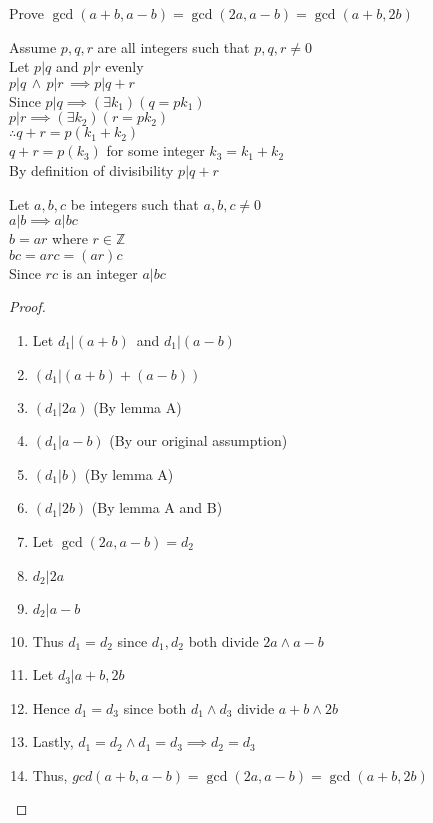 \documentclass[12pt]{article}
\newenvironment{lemma}[2][Lemma]{\begin{trivlist}
\item[\hskip \labelsep {\bfseries #1}\hskip \labelsep {\bfseries #2.}]}{\end{trivlist}}
\newenvironment{question}[2][Question]{\begin{trivlist}
\item[\hskip \labelsep {\bfseries #1}\hskip \labelsep {\bfseries #2.}]}{\end{trivlist}}
\newenvironment{level}%
{\addtolength{\itemindent}{2em}}%
{\addtolength{\itemindent}{-2em}}
\begin{document}
\begin{question}{6.17}Prove $\gcd(a+b,a-b)=\gcd(2a,a-b)=\gcd(a+b,2b)$\leavevmode
\begin{lemma}{A}
	Assume $p,q,r$ are all integers such that $p,q,r \neq 0$\\
	Let $p|q$ and $p|r$ evenly\\
	$p|q \, \wedge \, p|r \, \implies p|q+r$\\
	Since $p|q \implies (\exists k_1)(q=pk_1)$\\
	$p|r \implies (\exists k_2)(r=pk_2)$\\
	$\therefore q+r = p(k_1+k_2)$\\
	$q+r=p(k_3)$ for some integer $k_3=k_1+k_2$\\
	By definition of divisibility $p|q+r$\\
\end{lemma}
\begin{lemma}{B}
	Let $a,b,c$ be integers such that $a,b,c \neq 0$\\
	$a|b \implies a|bc$\\
	$b=ar$ where $r \in \mathbb{Z}$\\
	$bc=arc=(ar)c$\\
	Since $rc$ is an integer $a|bc$
\end{lemma}
\begin{proof}\leavevmode
\begin{enumerate}
	\item Let $d_1|(a+b)\,$ and $d_1|(a-b)$
	\begin{level}
		\item $(d_1 | (a+b)+(a-b))$
		\item $(d_1 | 2a )$ \hfill(By lemma A)
		\item $(d_1 | a-b )$ \hfill(By our original assumption)
		\item $(d_1 | b)$ \hfill(By lemma A)
		\item $(d_1 | 2b)$ \hfill(By lemma A and B)
	\end{level}
	\item Let $\gcd(2a,a-b)=d_2$
	\begin{level}
		\item $d_2 | 2a$
		\item $d_2 | a-b$
		\item Thus $d_1 = d_2$ since $d_1 , d_2$ both divide $2a \wedge a-b $
	\end{level}
	\item Let $d_3 | a+b,2b$
	\item Hence $d_1 = d_3$ since both $d_1 \wedge d_3$ divide $a+b \wedge 2b$ 
	\item Lastly, $d_1 = d_2 \wedge d_1 = d_3 \implies d_2 = d_3$
	\item Thus, $gcd(a+b,a-b)=\gcd(2a,a-b)=\gcd(a+b,2b)$
\end{enumerate}
\end{proof}
\end{question}
\end{document}

